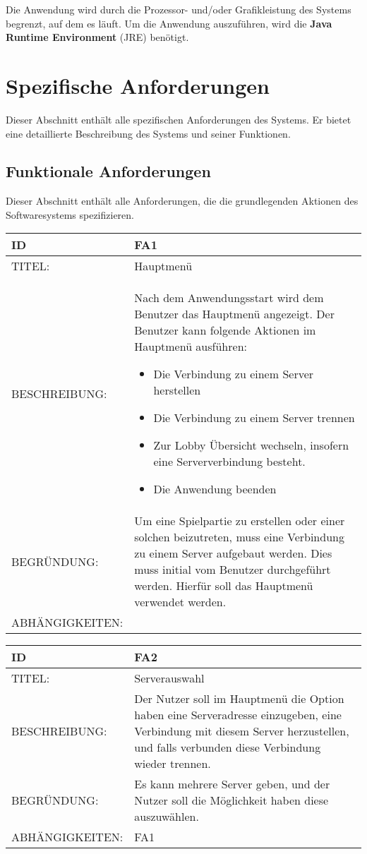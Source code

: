 \documentclass{uulm-assignment}
\begin{document}
Die Anwendung wird durch die Prozessor- und/oder Grafikleistung des Systems begrenzt, auf dem es
läuft. Um die Anwendung auszuführen, wird die \textbf{Java Runtime Environment} (JRE) benötigt.

\section{Spezifische Anforderungen}

Dieser Abschnitt enthält alle spezifischen Anforderungen des Systems. Er bietet eine detaillierte
Beschreibung des Systems und seiner Funktionen.

\subsection{Funktionale Anforderungen}

Dieser Abschnitt enthält alle Anforderungen, die die grundlegenden Aktionen des Softwaresystems
spezifizieren.

\begin{tabularx}{16cm}{l|X}
\textbf{ID} & \textbf{FA1} \\
\hline
TITEL: & Hauptmenü \\
\hline
BESCHREIBUNG: & Nach dem Anwendungsstart wird dem Benutzer das Hauptmenü angezeigt. Der Benutzer kann folgende Aktionen im Hauptmenü ausführen: 
\begin{itemize}
\item Die Verbindung zu einem Server herstellen
\item Die Verbindung zu einem Server trennen
\item Zur Lobby Übersicht wechseln, insofern eine Serververbindung besteht.
\item Die Anwendung beenden
\end{itemize}
\\
\hline
BEGRÜNDUNG: & Um eine Spielpartie zu erstellen oder einer solchen beizutreten, muss eine Verbindung zu einem Server aufgebaut werden. Dies muss initial vom Benutzer durchgeführt werden. Hierfür soll das Hauptmenü verwendet werden.\\
\hline
ABHÄNGIGKEITEN: & \\
\end{tabularx}

\begin{tabularx}{16cm}{l|X}
\textbf{ID} & \textbf{FA2} \\
\hline
TITEL: & Serverauswahl\\
\hline
BESCHREIBUNG: & Der Nutzer soll im Hauptmenü die Option haben eine Serveradresse einzugeben, eine
Verbindung mit diesem Server herzustellen, und falls verbunden diese Verbindung wieder trennen.
\\
\hline
BEGRÜNDUNG: & Es kann mehrere Server geben, und der Nutzer soll die Möglichkeit haben diese auszuwählen.\\
\hline
ABHÄNGIGKEITEN: & FA1\\
\end{tabularx}
\end{document}
